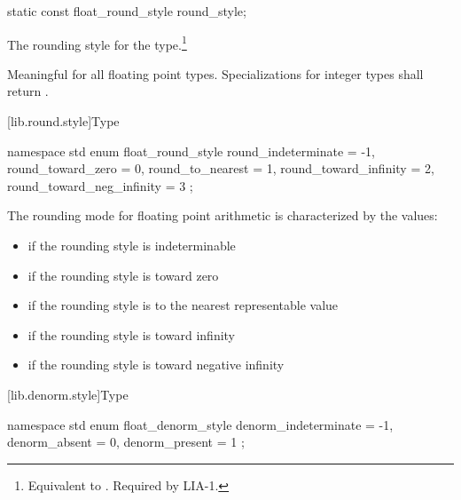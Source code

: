 \begin{itemdecl}
static const float_round_style round_style;
\end{itemdecl}

\begin{itemdescr}
\pnum
The rounding style for the type.\footnote{Equivalent to .
Required by LIA-1.}

\pnum
Meaningful for all floating point types.
Specializations for integer types shall return
.
\end{itemdescr}

[lib.round.style]{Type }

%
\begin{codeblock}
namespace std {
  enum float_round_style {
    round_indeterminate       = -1,
    round_toward_zero         =  0,
    round_to_nearest          =  1,
    round_toward_infinity     =  2,
    round_toward_neg_infinity =  3
  };
}
\end{codeblock}

\pnum
The rounding mode for floating point arithmetic is characterized by the
values:

\begin{itemize}
\item
{}%
if the rounding style is indeterminable
\item
{}%
if the rounding style is toward zero
\item
{}%
if the rounding style is to the nearest representable value
\item
{}%
if the rounding style is toward infinity
\item
{}%
if the rounding style is toward negative infinity
\end{itemize}

[lib.denorm.style]{Type }

%
\begin{codeblock}
namespace std {
  enum float_denorm_style {
    denorm_indeterminate = -1,
    denorm_absent = 0,
    denorm_present = 1
  };
}
\end{codeblock}

